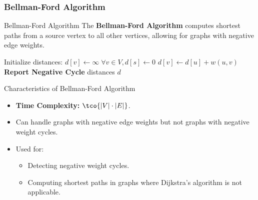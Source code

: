 



\newpage
\subsubsection{Bellman-Ford Algorithm}
\begin{definition}[]{Bellman-Ford Algorithm}
    The \textbf{Bellman-Ford Algorithm} computes shortest paths from a source vertex to all other vertices, allowing for graphs with negative edge weights.
\end{definition}

\begin{algorithm}
    \caption{Bellman-Ford Algorithm}
    \begin{algorithmic}[1]
         
            \State Initialize distances: $d[v] \gets \infty \; \forall v \in V, d[s] \gets 0$
             
                        \State $d[v] \gets d[u] + w(u, v)$
                    \EndIf
                \EndFor
            \EndFor
             
                    \State \textbf{Report Negative Cycle}
                \EndIf
            \EndFor
            \State \Return distances $d$
        \EndProcedure
    \end{algorithmic}
\end{algorithm}

\begin{properties}[]{Characteristics of Bellman-Ford Algorithm}
    \begin{itemize}
        \item \textbf{Time Complexity:} $\tco{|V| \cdot |E|}$.
        \item Can handle graphs with negative edge weights but not graphs with negative weight cycles.
        \item Used for:
              \begin{itemize}
                  \item Detecting negative weight cycles.
                  \item Computing shortest paths in graphs where Dijkstra’s algorithm is not applicable.
              \end{itemize}
    \end{itemize}
\end{properties}

